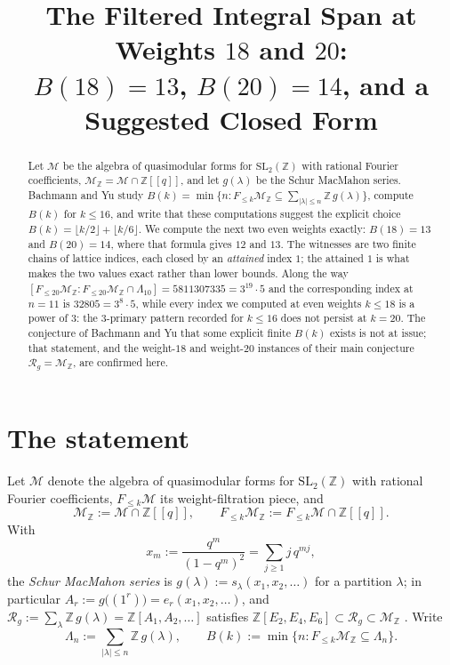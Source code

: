 \documentclass[11pt]{amsart}
\title[$B(18)=13$ and $B(20)=14$ for the filtered integral span]
{The Filtered Integral Span at Weights $18$ and $20$:\\$B(18)=13$, $B(20)=14$, and a Suggested Closed Form}
\date{}
\theoremstyle{remark}
\newcommand{\Mm}{\mathcal M}
\newcommand{\MZ}{\mathcal M_{\mathbb Z}}
\newcommand{\Rg}{\mathcal R_g}
\newcommand{\Lam}{\Lambda}
\begin{document}
\begin{abstract}
Let $\Mm$ be the algebra of quasimodular forms for $\mathrm{SL}_2(\mathbb Z)$ with rational
Fourier coefficients, $\MZ=\Mm\cap\mathbb Z[[q]]$, and let $g(\lambda)$ be the Schur MacMahon
series. Bachmann and Yu study
$B(k)=\min\{n:F_{\le k}\MZ\subseteq\sum_{|\lambda|\le n}\mathbb Z\,g(\lambda)\}$,
compute $B(k)$ for $k\le16$, and write that these computations suggest the explicit choice
$B(k)=\lfloor k/2\rfloor+\lfloor k/6\rfloor$.
We compute the next two even weights exactly: $B(18)=13$ and $B(20)=14$, where that formula
gives $12$ and $13$.
The witnesses are two finite chains of lattice indices, each closed by an \emph{attained} index
$1$; the attained $1$ is what makes the two values exact rather than lower bounds. Along the way
$[F_{\le20}\MZ:F_{\le20}\MZ\cap\Lam_{10}]=5811307335=3^{19}\cdot5$ and the corresponding index at
$n=11$ is $32805=3^{8}\cdot5$, while every index we computed at even weights $k\le18$ is a power of
$3$: the $3$-primary pattern recorded for $k\le16$ does not persist at $k=20$.
The conjecture of Bachmann and Yu that some explicit finite $B(k)$ exists is not at issue; that
statement, and the weight-$18$ and weight-$20$ instances of their main conjecture $\Rg=\MZ$, are
confirmed here.
\end{abstract}

\maketitle

\section{The statement}

Let $\Mm$ denote the algebra of quasimodular forms for $\mathrm{SL}_2(\mathbb Z)$ with rational
Fourier coefficients, $F_{\le k}\Mm$ its weight-filtration piece, and
\[
 \MZ:=\Mm\cap\mathbb Z[[q]],\qquad F_{\le k}\MZ:=F_{\le k}\Mm\cap\mathbb Z[[q]].
\]
With
\[
 x_m:=\frac{q^m}{(1-q^m)^2}=\sum_{j\ge1}j\,q^{mj},
\]
the \emph{Schur MacMahon series} is $g(\lambda):=s_\lambda(x_1,x_2,\dots)$ for a partition
$\lambda$; in particular $A_r:=g\bigl((1^r)\bigr)=e_r(x_1,x_2,\dots)$, and
$\Rg:=\sum_\lambda\mathbb Z\,g(\lambda)=\mathbb Z[A_1,A_2,\dots]$ satisfies
$\mathbb Z[E_2,E_4,E_6]\subset\Rg\subset\MZ$ \cite{BY}. Write
\[
 \Lam_n:=\sum_{|\lambda|\le n}\mathbb Z\,g(\lambda),
 \qquad
 B(k):=\min\bigl\{n:F_{\le k}\MZ\subseteq\Lam_n\bigr\}.
\]
\end{document}
